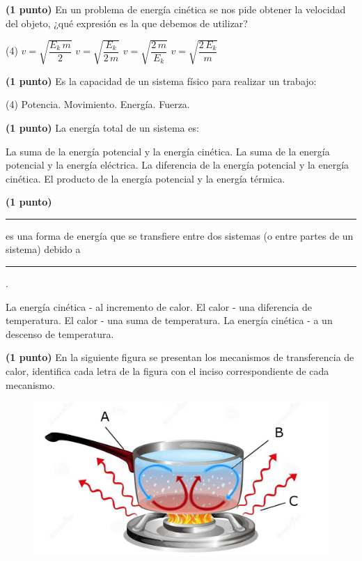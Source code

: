 \documentclass[12pt, letter]{exam}
\begin{document}
\begin{questions}
    \question \textbf{(1 punto)} En un problema de energía cinética se nos pide obtener la velocidad del objeto, ¿qué expresión es la que debemos de utilizar?
    \begin{tasks}(4)
        \task $v = \sqrt{\dfrac{E_{k} \, m}{2}}$
        \task $v = \sqrt{\dfrac{E_{k}}{2 \, m}}$
        \task $v = \sqrt{\dfrac{2 \, m}{E_{k}}}$
        \task $v = \sqrt{\dfrac{2 \, E_{k}}{m}}$
    \end{tasks}
    \question \textbf{(1 punto)} Es la capacidad de un sistema físico para realizar un trabajo:
    \begin{tasks}(4)
        \task Potencia.
        \task Movimiento.
        \task Energía.
        \task Fuerza.
    \end{tasks}
    \question \textbf{(1 punto)} La energía total de un sistema es:
    \begin{tasks}
        \task La suma de la energía potencial y la energía cinética.
        \task La suma de la energía potencial y la energía eléctrica.
        \task La diferencia de la energía potencial y la energía cinética.
        \task El producto de la energía potencial y la energía térmica.
    \end{tasks}
    \question \textbf{(1 punto)} \rule{2cm}{0.1mm} es una forma de energía que se transfiere entre dos sistemas (o entre partes de un sistema) debido a \rule{2cm}{0.1mm}.
    \begin{tasks}
        \task La energía cinética - al incremento de calor.
        \task El calor - una diferencia de temperatura.
        \task El calor - una suma de temperatura.
        \task La energía cinética - a un descenso de temperatura.
    \end{tasks}
    \question \textbf{(1 punto)} En la siguiente figura se presentan los mecanismos de transferencia de calor, identifica cada letra de la figura con el inciso correspondiente de cada mecanismo.
    \begin{figure}[H]
        \centering
        \includegraphics[scale=0.2]{Transferencia_Calor_01.jpg}

\end{figure}
\end{questions}
\end{document}
